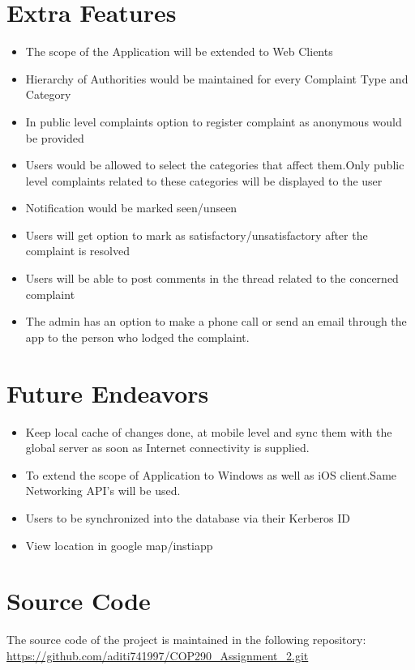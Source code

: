\documentclass{article}
\begin{document}
	\section{Extra Features}
		\begin{itemize}
			\item The scope of the Application will be extended to Web Clients
			\item Hierarchy of Authorities would be maintained for every Complaint Type and Category
			\item In public level complaints option to register complaint as anonymous would be provided
			\item Users would be allowed to select the categories that affect them.Only public level complaints related to these categories will be displayed to the user
			\item Notification would be marked seen/unseen
			\item Users will get option to mark as satisfactory/unsatisfactory after the complaint is resolved
			\item Users will be able to post comments in the thread related to the concerned complaint
			\item The admin has an option to make a phone call or send an email through the app to the person who lodged the complaint.
		\end{itemize}

	\section{Future Endeavors} 
		\begin{itemize} 
			\item Keep local cache of changes done, at mobile level and sync them with the global server as soon as Internet connectivity is supplied.
			\item To extend the scope of Application to Windows as well as iOS client.Same Networking API's will be used.
			\item Users to be synchronized into the database via their Kerberos ID
			\item View location in google map/instiapp
		\end{itemize}   
	\section{Source Code}
	The source code of the project is maintained in the following repository: \\
	\url{https://github.com/aditi741997/COP290_Assignment_2.git}
	
	\medskip
	
\end{document}
